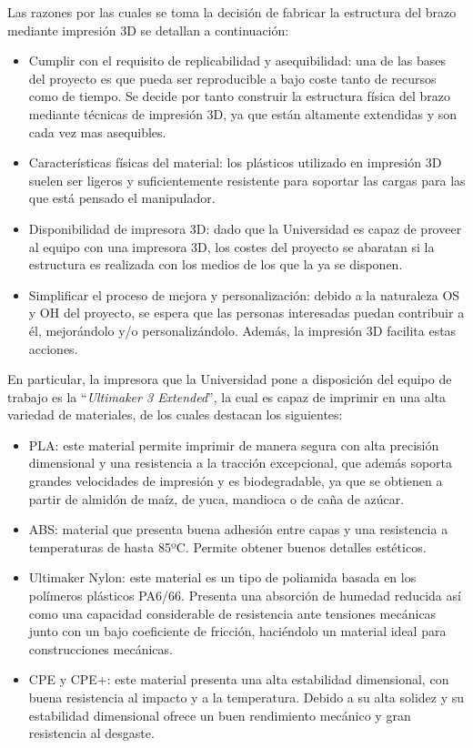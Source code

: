 Las razones por las cuales se toma la decisión de fabricar la estructura del brazo mediante impresión 3D se detallan a continuación:

\begin{itemize}
  \item Cumplir con el requisito de replicabilidad y asequibilidad: una de las bases del proyecto es que pueda ser reproducible a bajo coste tanto de recursos como de tiempo. Se decide por tanto construir la estructura física del brazo mediante técnicas de impresión 3D, ya que están altamente extendidas y son cada vez mas asequibles.
  
  \item Características físicas del material: los plásticos utilizado en impresión 3D suelen ser ligeros y suficientemente resistente para soportar las cargas para las que está pensado el manipulador.
  
  \item Disponibilidad de impresora 3D: dado que la Universidad es capaz de proveer al equipo con una impresora 3D, los costes del proyecto se abaratan si la estructura es realizada con los medios de los que la ya se disponen.
  
  \item Simplificar el proceso de mejora y personalización: debido a la naturaleza \ac{OS} y \ac{OH} del proyecto, se espera que las personas interesadas puedan contribuir a él, mejorándolo y/o personalizándolo. Además, la impresión 3D facilita estas acciones.
\end{itemize}

En particular, la impresora que la Universidad pone a disposición del equipo de trabajo es la ``\textit{Ultimaker 3 Extended}'', la cual es capaz de imprimir en una alta variedad de materiales, de los cuales destacan los siguientes:

\begin{itemize}
    \item \ac{PLA}\cite{AcidoPolilactico2020}: este material permite imprimir de manera segura con alta precisión dimensional y una resistencia a la tracción excepcional, que además soporta grandes velocidades de impresión y es biodegradable, ya que se obtienen a partir de almidón de maíz, de yuca, mandioca o de caña de azúcar. 
    \item \ac{ABS}\cite{AcrilonitriloButadienoEstireno2020}: material que presenta buena adhesión entre capas y una resistencia a temperaturas de hasta 85ºC. Permite obtener buenos detalles estéticos.
    \item Ultimaker Nylon: este material es un tipo de poliamida basada en los polímeros plásticos PA6/66. Presenta una absorción de humedad reducida así como una capacidad considerable de resistencia ante tensiones mecánicas junto con un bajo coeficiente de fricción, haciéndolo un material ideal para construcciones mecánicas.
    \item CPE y CPE+: este material presenta una alta estabilidad dimensional, con buena resistencia al impacto y a la temperatura. Debido a su alta solidez y su estabilidad dimensional ofrece un buen rendimiento mecánico y gran resistencia al desgaste.
\end{itemize}

